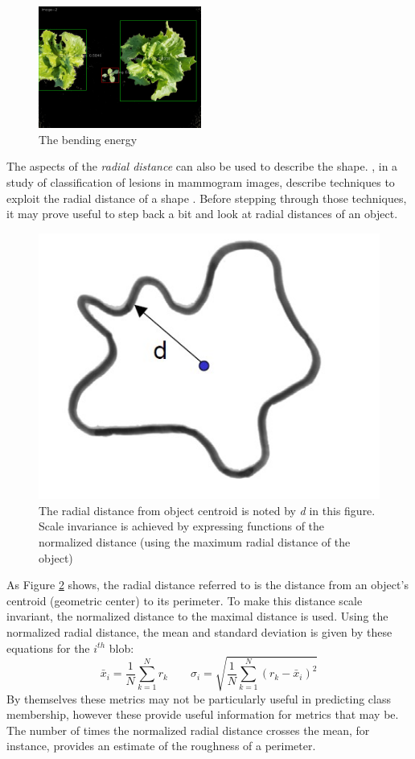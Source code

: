 \documentclass[letterpaper]{article}
\begin{document}
{{%

\begin{figure}[h!]
	\centering
	\includegraphics[height=4cm]{./figures/shape-bending.jpg}
	\caption[Shape attribute: Bending Energy]{The bending energy}
	\label{fig:shape-bending}
\end{figure}

The aspects of the \textit{radial distance} can also be used to describe the shape. \citeauthor{Kilday1993-aq}, in a study of classification of lesions in mammogram images, describe techniques to exploit the radial distance of a shape \parencite{Kilday1993-aq}. Before stepping through those techniques, it may prove useful to step back a bit and look at radial distances of an object.
\begin{figure}[H]
	\centering
	\includegraphics[width=.25\linewidth]{./figures/radial-distance.jpg}
	\caption[Radial distance from object centroid]{The radial distance from object centroid is noted by \textit{d} in this figure. Scale invariance is achieved by expressing functions of the normalized distance (using the maximum radial distance of the object)}
	\label{fig:radial-distance}	
\end{figure}
As Figure \ref{fig:radial-distance} shows, the radial distance referred to is the distance from an object's centroid (geometric center) to its perimeter. To make this distance scale invariant, the normalized distance to the maximal distance is used. Using the normalized radial distance, the mean and standard deviation is given by these equations for the $i^{th}$ blob:
\begin{equation}%
\bar{x}_i = \frac{1}{N}\sum_{k=1}^{N}r_k \qquad
\sigma_i = \sqrt{\frac{1}{N}\sum_{k=1}^{N}({r_k} - \bar{x}_i)^2}
\end{equation}
By themselves these metrics may not be particularly useful in predicting class membership, however these provide useful information for metrics that may be. The number of times the normalized radial distance crosses the mean, for instance, provides an estimate of the roughness of a perimeter.


}}
\end{document}
